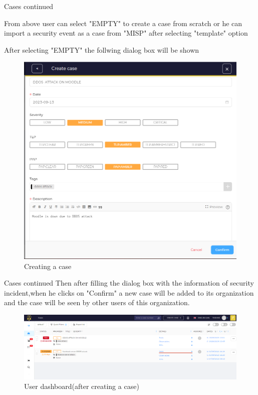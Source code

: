 \begin{frame}{Cases continued}
\begin{justify}

From above user can select "EMPTY" to create a case from scratch or he can import a security event as a case from "MISP" after selecting "template" 
option

After selecting "EMPTY" the follwing dialog box will be shown
\begin{figure}[htp]
    \centering
    \includegraphics[scale = 0.28]{Craete empty case.png}
    \caption{Creating a case}
    \label{Creating a case}
\end{figure}


\end{justify}

\end{frame}

\begin{frame}{Cases continued}
  Then after filling the dialog box with the information of security incident,when he clicks on "Confirm" a new case will be added to its organization and the case will be seen by other users of this organization.
\begin{figure}[htp]
    \centering
    \includegraphics[scale = 0.28]{New case added.png}
    \caption{User dashboard(after creating a case)}
    \label{User dashboard(after creating a case)}
\end{figure}
    
\end{frame}


